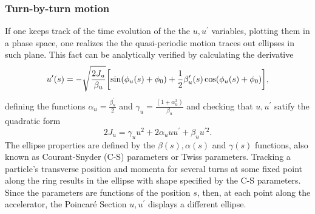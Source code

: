 \subsubsection{Turn-by-turn motion}
If one keeps track of the time evolution of the the $u, u^\prime$ variables, plotting them in a phase space, one realizes the the quasi-periodic motion traces out ellipses in such plane. This fact can be analytically verified by calculating the derivative
    \begin{equation}
        u^{\prime}(s) = - \sqrt{\frac{2J_u}{\beta_u}}\qty[\sin(\phi_u(s) + \phi_0) + \frac{1}{2}\beta_u^\prime(s)\cos(\phi_u(s) + \phi_0)],
        \label{eq:uprime}
    \end{equation}
    defining the functions $\alpha_u = \frac{\beta_u^\prime}{2}$  and $\gamma_u = \frac{(1+\alpha_u^2)}{\beta_u}$ and checking that $u, u^\prime$ satify the quadratic form
    \begin{equation}
        2J_u=\gamma_u u^{2}+2\alpha_u u u^{\prime}+\beta_u u^{\prime2}.
     \end{equation}
The ellipse properties are defined by the $\beta(s), \alpha(s)$ and $\gamma(s)$ functions, also known as Courant-Snyder (C-S) parameters or Twiss parameters. Tracking a particle's transverse position and momenta for several turns at some fixed point along the ring results in the ellipse with shape specified by the C-S parameters. Since the parameters are functions of the position $s$, then, at each point along the accelerator, the Poincaré Section $u, u^\prime$ displays a different ellipse.

